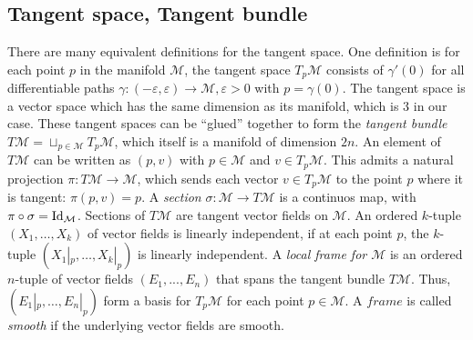 \documentclass[../thesis.tex]{subfiles}
\begin{document}
\subsection{Tangent space, Tangent bundle} There are many equivalent definitions
for the tangent space. One definition is for each point $p$ in the manifold $\mathcal{M}$,
the tangent space $T_p\mathcal{M}$ consists of $\gamma'(0)$ for all differentiable paths $\gamma: (-\varepsilon, \varepsilon) \to \mathcal{M}, \varepsilon > 0$
with $p = \gamma(0)$. The tangent space is a vector space which has the same dimension as its manifold,
which is 3 in our case. These tangent spaces can be ``glued'' together to form the
\emph{tangent bundle} $T\mathcal{M} = \sqcup _{p \in \mathcal{M}}T_p\mathcal{M}$, which itself
is a manifold of dimension $2n$. An element of $T\mathcal{M}$ can be written
as $(p,v)$ with $p \in \mathcal{M}$ and $v \in T_p\mathcal{M}$. This admits a natural projection $\pi : T\mathcal{M} \to \mathcal{M}$,
which sends each vector $v \in T_p\mathcal{M}$ to the point $p$ where it is tangent: $\pi(p,v)=p$.
A \emph{section} $\sigma: \mathcal{M} \to T\mathcal{M}$ is a continuos map, with $\pi \circ \sigma = \operatorname{Id}_{\mathcal{M}}$.
Sections of $T\mathcal{M}$ are tangent vector fields on $\mathcal{M}$.
An ordered $k$-tuple $(X_1, \dots, X_k)$ of vector fields is linearly independent,
if at each point $p$, the $k$-tuple $(X_1|_p, \dots, X_k|_p)$ is linearly independent.
A \emph{local frame for $\mathcal{M}$} is an ordered $n$-tuple of vector fields $(E_1, ..., E_n)$
that spans the tangent bundle $T\mathcal{M}$. Thus, $(E_1|_p,\dots, E_n|_p)$ form
a basis for $T_p\mathcal{M}$ for each point $p\in \mathcal{M}$.
A $frame$ is called \emph{smooth} if the underlying vector fields are smooth.
\end{document}
